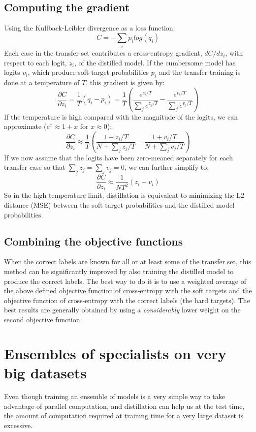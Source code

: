 \documentclass[a4paper,twocolumn]{article}
\begin{document}
\subsection{Computing the gradient}
Using the Kullback-Leibler divergence as a loss function:
\[
    C = - \sum_i p_i log(q_i)
\]
Each case in the transfer set contributes a cross-entropy gradient, $dC/dz_i$, with respect to each logit, $z_i$, of the distilled model. If the cumbersome model has logits $v_i$, which produce soft target probabilities $p_i$ and the transfer training is done at a temperature of $T$, this gradient is given by:
\[
    \frac{\partial C}{\partial z_i} = \frac{1}{T}(q_i - p_i) = \frac{1}{T}\left( \frac{e^{z_i/T}}{\sum_j e^{z_j/T}} - \frac{e^{v_i/T}}{\sum_j e^{v_j/T}} \right)
\]
If the temperature is high compared with the magnitude of the logits, we can approximate ($e^x \approx 1+x$ for $x \approx 0$):
\[
    \frac{\partial C}{\partial z_i} \approx \frac{1}{T}\left( \frac{1 + z_i/T}{N + \sum_j z_j/T} - \frac{1 + v_i/T}{N + \sum_j v_j/T} \right)
\]
If we now assume that the logits have been zero-meaned separately for each transfer case so that $\sum_j z_j = \sum_j v_j = 0$, we can further simplify to:
\[
    \frac{\partial C}{\partial z_i} \approx \frac{1}{NT^2} (z_i - v_i)
\]
So in the high temperature limit, distillation is equivalent to minimizing the L2 distance (MSE) between the soft target probabilities and the distilled model probabilities.

\subsection{Combining the objective functions}
When the correct labels are known for all or at least some of the transfer set, this method can be significantly improved by also training the distilled model to produce the correct labels. The best way to do it is to use a weighted average of the above defined objective function of cross-entropy with the soft targets and the objective function of cross-entropy with the correct labels (the hard targets). The best results are generally obtained by using a \textit{considerably} lower weight on the second objective function.

\section{Ensembles of specialists on very big datasets}
Even though training an ensemble of models is a very simple way to take advantage of parallel computation, and distillation can help us at the test time, the amount of computation required at training time for a very large dataset is excessive.
\end{document}
